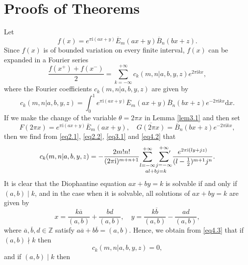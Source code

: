 \documentclass[reqno]{amsart}
\numberwithin{equation}{section}
\begin{document}
\section{Proofs of Theorems}

Let
\begin{equation*}
f(x)=e^{\pi\mathrm{i}(ax+y)}\overline{E}_{m}(ax+y)\overline{B}_{n}(bx+z).
\end{equation*}
Since $f(x)$ is of bounded variation on every finite interval, $f(x)$ can be expanded in a Fourier series
\begin{equation}\label{eq4.1}
\frac{f(x^{+})+f(x^{-})}{2}=\sum_{k=-\infty}^{+\infty}c_{k}(m,n|a,b,y,z)e^{2\pi\mathrm{i}kx},
\end{equation}
where the Fourier coefficients $c_{k}(m,n|a,b,y,z)$ are given by
\begin{equation}\label{eq4.2}
c_{k}(m,n|a,b,y,z)=\int_{0}^{1}e^{\pi\mathrm{i}(ax+y)}\overline{E}_{m}(ax+y)\overline{B}_{n}(bx+z)e^{-2\pi\mathrm{i}kx}\text{d}x.
\end{equation}
If we make the change of the variable $\theta=2\pi x$ in Lemma \ref{lem3.1} and then set
\begin{equation*}
F(2\pi x)=e^{\pi\mathrm{i}(ax+y)}\overline{E}_{m}(ax+y),\quad\overline{G(2\pi x)}=\overline{B}_{n}(bx+z)e^{-2\pi\mathrm{i}kx},
\end{equation*}
then we find from \eqref{eq2.1}, \eqref{eq2.2}, \eqref{eq3.1} and \eqref{eq4.2} that
\begin{equation}\label{eq4.3}
c_{k}(m,n|a,b,y,z)=-\frac{2m!n!}{(2\pi \mathrm{i})^{m+n+1}}\underset{al+bj=k}{\sum_{l=-\infty}^{+\infty}\sideset{}{'}\sum_{j=-\infty}^{+\infty}}\frac{e^{2\pi\mathrm{i}(ly+jz)}} {(l-\frac{1}{2})^{m+1}j^{n}}.
\end{equation}
It is clear that the Diophantine equation $ax+by=k$ is solvable if and only if $(a,b)\mid k$, and in the case when it is solvable, all solutions of
$ax+by=k$ are given by
\begin{equation*}
x=\frac{k\overline{a}}{(a,b)}+\frac{bd}{(a,b)},\quad y=\frac{k\overline{b}}{(a,b)}-\frac{ad}{(a,b)},
\end{equation*}
where $\overline{a},\overline{b},d\in\mathbb{Z}$ satisfy $a\overline{a}+b\overline{b}=(a,b)$. Hence, we obtain from \eqref{eq4.3} that if $(a,b)\nmid k$ then
\begin{equation}\label{eq4.4}
c_{k}(m,n|a,b,y,z)=0,
\end{equation}
and if $(a,b)\mid k$ then
\end{document}
